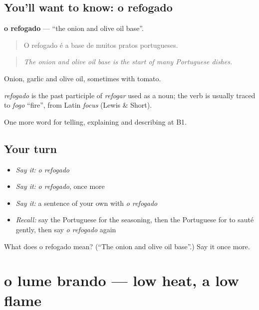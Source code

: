 \subsection*{You'll want to know: o refogado}
\textbf{o refogado} — \textquotedblleft{}the onion and olive oil base\textquotedblright{}.

\begin{quote}
O refogado é a base de muitos pratos portugueses.
\end{quote}

\begin{quote}
\emph{The onion and olive oil base is the start of many Portuguese dishes.}
\end{quote}

Onion, garlic and olive oil, sometimes with tomato.

\begin{cousinweb}
\emph{refogado} is the past participle of \emph{refogar} used as a noun; the verb is usually traced to \emph{fogo} \textquotedblleft{}fire\textquotedblright{}, from Latin \emph{focus} (Lewis \& Short).
\end{cousinweb}

\begin{grammarlens}[title={What you've built}]
One more word for telling, explaining and describing at B1.
\end{grammarlens}

\subsection*{Your turn}
\begin{itemize}
\raggedright
  \item \emph{Say it:} \emph{o refogado}
  \item \emph{Say it:} \emph{o refogado}, once more
  \item \emph{Say it:} a sentence of your own with \emph{o refogado}
  \item \emph{Recall:} say the Portuguese for the seasoning, then the Portuguese for to sauté gently, then say \emph{o refogado} again
\end{itemize}

\begin{tcolorbox}[breakable,colback=teal!4,colframe=teal!35!black,title={Before you move on}]
What does o refogado mean? (\textquotedblleft{}The onion and olive oil base\textquotedblright{}.) Say it once more.
\end{tcolorbox}
\section[o lume brando]{o lume brando — low heat, a low flame}

